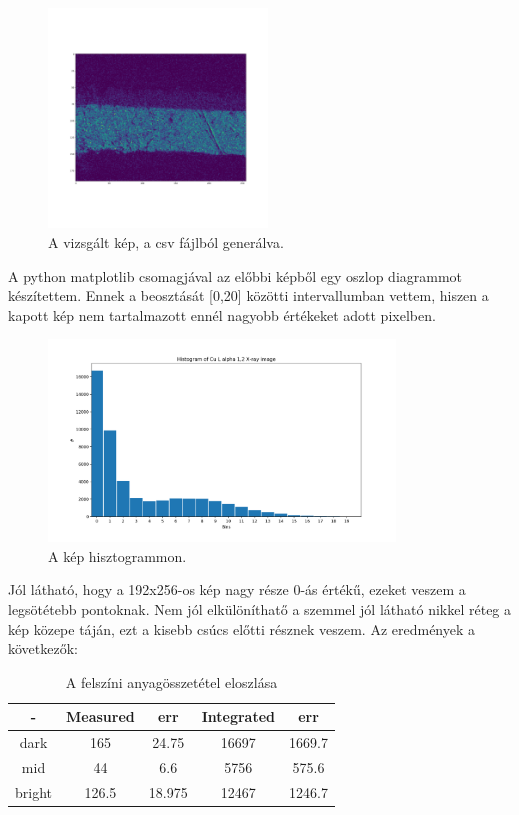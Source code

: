 \documentclass[a4paper,12pt]{article}
\begin{document}
\begin{figure}[H]
	\centering
	\includegraphics[width=0.52\textwidth]{histoimg.png}
	\caption{A vizsgált kép, a csv fájlból generálva.}
\end{figure}

\par A python matplotlib csomagjával az előbbi képből egy oszlop diagrammot
készítettem. Ennek a beosztását [0,20] közötti intervallumban vettem, hiszen a
kapott kép nem tartalmazott ennél nagyobb értékeket adott pixelben.

\begin{figure}[H]
	\centering
	\includegraphics[width=0.82\textwidth]{histo.png}
	\caption{A kép hisztogrammon.}
\end{figure}

\par Jól látható, hogy a 192x256-os kép nagy része 0-ás értékű, ezeket veszem a legsötétebb
pontoknak. Nem jól elkülöníthatő a szemmel jól látható nikkel réteg a kép
közepe táján, ezt a kisebb csúcs előtti résznek veszem. Az eredmények a következők:

\begin{table}[H]
	\centering
	\begin{tabular}{|c|c|c|c|c|}  \hline
		-      & Measured & err    & Integrated & err    \\ \hline
		dark   & 165      & 24.75  & 16697      & 1669.7 \\ \hline
		mid    & 44       & 6.6    & 5756       & 575.6  \\ \hline
		bright & 126.5    & 18.975 & 12467      & 1246.7 \\ \hline
	\end{tabular}
	\caption{A felszíni anyagösszetétel eloszlása}
	\label{my-label}
\end{table}
\end{document}
